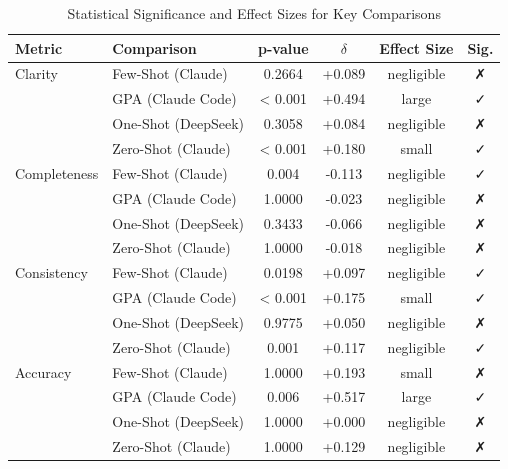 
\begin{table}[ht]
\centering
\caption{Statistical Significance and Effect Sizes for Key Comparisons}
\label{tab:statistical_results}
\begin{tabular}{llcccc}
\hline
\textbf{Metric} & \textbf{Comparison} & \textbf{p-value} & \textbf{$\delta$} & \textbf{Effect Size} & \textbf{Sig.} \\
\hline
Clarity & Few-Shot (Claude) & 0.2664 & +0.089 & negligible & ✗ \\
 & GPA (Claude Code) & < 0.001 & +0.494 & large & ✓ \\
 & One-Shot (DeepSeek) & 0.3058 & +0.084 & negligible & ✗ \\
 & Zero-Shot (Claude) & < 0.001 & +0.180 & small & ✓ \\
Completeness & Few-Shot (Claude) & 0.004 & -0.113 & negligible & ✓ \\
 & GPA (Claude Code) & 1.0000 & -0.023 & negligible & ✗ \\
 & One-Shot (DeepSeek) & 0.3433 & -0.066 & negligible & ✗ \\
 & Zero-Shot (Claude) & 1.0000 & -0.018 & negligible & ✗ \\
Consistency & Few-Shot (Claude) & 0.0198 & +0.097 & negligible & ✓ \\
 & GPA (Claude Code) & < 0.001 & +0.175 & small & ✓ \\
 & One-Shot (DeepSeek) & 0.9775 & +0.050 & negligible & ✗ \\
 & Zero-Shot (Claude) & 0.001 & +0.117 & negligible & ✓ \\
Accuracy & Few-Shot (Claude) & 1.0000 & +0.193 & small & ✗ \\
 & GPA (Claude Code) & 0.006 & +0.517 & large & ✓ \\
 & One-Shot (DeepSeek) & 1.0000 & +0.000 & negligible & ✗ \\
 & Zero-Shot (Claude) & 1.0000 & +0.129 & negligible & ✗ \\
\hline
\end{tabular}
\end{table}
